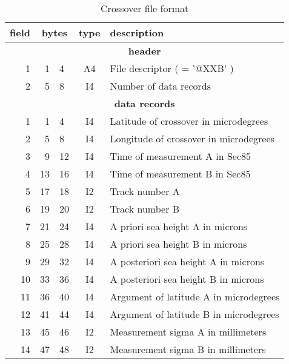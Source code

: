 \begin{table}
\caption{Crossover file format}
\medskip
\begin{tabular}{|rr@{--}lc|p{}|}
\hline
field&\multicolumn{2}{c}{bytes}&type&description \\
\hline
\multicolumn{5}{c}{\bf header} \\
\hline
 1 & 1 & 4 & A4 & File descriptor ( = '@XXB' ) \\
 2 & 5 & 8 & I4 & Number of data records \\
\hline
\multicolumn{5}{c}{\bf data records} \\
\hline
 1 & 1 & 4 & I4 & Latitude of crossover in microdegrees \\
 2 & 5 & 8 & I4 & Longitude of crossover in microdegrees \\
 3 & 9 &12 & I4 & Time of measurement A in Sec85 \\
 4 &13 &16 & I4 & Time of measurement B in Sec85 \\
 5 &17 &18 & I2 & Track number A \\
 6 &19 &20 & I2 & Track number B \\
 7 &21 &24 & I4 & A priori sea height A in microns \\
 8 &25 &28 & I4 & A priori sea height B in microns \\
 9 &29 &32 & I4 & A posteriori sea height A in microns \\
10 &33 &36 & I4 & A posteriori sea height B in microns \\
11 &36 &40 & I4 & Argument of latitude A in microdegrees \\
12 &41 &44 & I4 & Argument of latitude B in microdegrees \\
13 &45 &46 & I2 & Measurement sigma A in millimeters \\
14 &47 &48 & I2 & Measurement sigma B in millimeters \\
\hline
\end{tabular}
\end{table}

